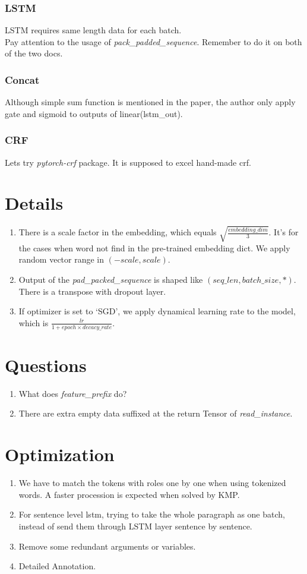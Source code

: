 \documentclass[12pt]{article}
\begin{document}
    \subsubsection{LSTM}\label{lstm}
    LSTM requires same length data for each batch.\\
    Pay attention to the usage of \emph{pack\_padded\_sequence}. Remember to do it on both of the two docs.
    \subsubsection{Concat}\label{concat}
    Although simple sum function is mentioned in the paper, the author only apply gate and sigmoid to
    outputs of linear(lstm\_out).
    \subsubsection{CRF}\label{crf}
    Lets try \emph{pytorch-crf} package. It is supposed to excel hand-made crf.
    \section{Details}
    \begin{enumerate}
        \item There is a scale factor in the embedding, which equals $\sqrt{\frac{embedding\_dim}{3}}$.
        It's for the cases when word not find in the pre-trained embedding dict. We apply random vector range in $(-scale, scale)$.
        \item Output of the \emph{pad\_packed\_sequence} is shaped like $(seq\_len, batch\_size, *)$.
        There is a transpose with dropout layer.
        \item If optimizer is set to `SGD', we apply dynamical learning rate to the model, which is $\frac{lr}{1 + epoch \times decacy\_rate}$.
    \end{enumerate}
    \section{Questions}
    \begin{enumerate}
        \item What does \emph{feature\_prefix} do?
        \item There are extra empty data suffixed at the return Tensor of \emph{read\_instance}.
    \end{enumerate}
    \section{Optimization}
    \begin{enumerate}
        \item We have to match the tokens with roles one by one when using tokenized words.
        A faster procession is expected when solved by KMP. 
        \item For sentence level lstm, trying to take the whole paragraph as one batch,
        instead of send them through LSTM layer sentence by sentence.
        \item Remove some redundant arguments or variables.
        \item Detailed Annotation.
    \end{enumerate}
\end{document}

